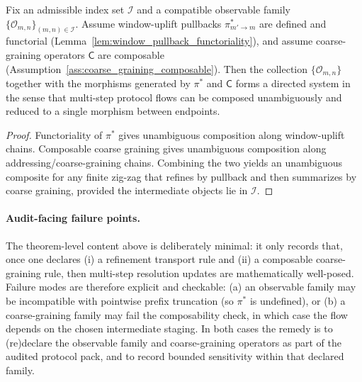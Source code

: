 \begin{proposition}\label{prop:protocol_flow_directed_system}
\MathTag Fix an admissible index set $\mathcal{I}$ and a compatible observable family $\{\mathcal{O}_{m,n}\}_{(m,n)\in\mathcal{I}}$.
Assume window-uplift pullbacks $\pi_{m'\to m}^\ast$ are defined and functorial (Lemma~\ref{lem:window_pullback_functoriality}), and assume coarse-graining operators $\mathsf{C}$ are composable (Assumption~\ref{ass:coarse_graining_composable}).
Then the collection $\{\mathcal{O}_{m,n}\}$ together with the morphisms generated by $\pi^\ast$ and $\mathsf{C}$ forms a directed system in the sense that multi-step protocol flows can be composed unambiguously and reduced to a single morphism between endpoints.
\end{proposition}
\begin{proof}
Functoriality of $\pi^\ast$ gives unambiguous composition along window-uplift chains.
Composable coarse graining gives unambiguous composition along addressing/coarse-graining chains.
Combining the two yields an unambiguous composite for any finite zig-zag that refines by pullback and then summarizes by coarse graining, provided the intermediate objects lie in $\mathcal{I}$.
\end{proof}

\paragraph{Audit-facing failure points.}
\AuditTag The theorem-level content above is deliberately minimal: it only records that, once one declares (i) a refinement transport rule and (ii) a composable coarse-graining rule, then multi-step resolution updates are mathematically well-posed.
Failure modes are therefore explicit and checkable:
(a) an observable family may be incompatible with pointwise prefix truncation (so $\pi^\ast$ is undefined),
or (b) a coarse-graining family may fail the composability check, in which case the flow depends on the chosen intermediate staging.
In both cases the remedy is to (re)declare the observable family and coarse-graining operators as part of the audited protocol pack, and to record bounded sensitivity within that declared family.


